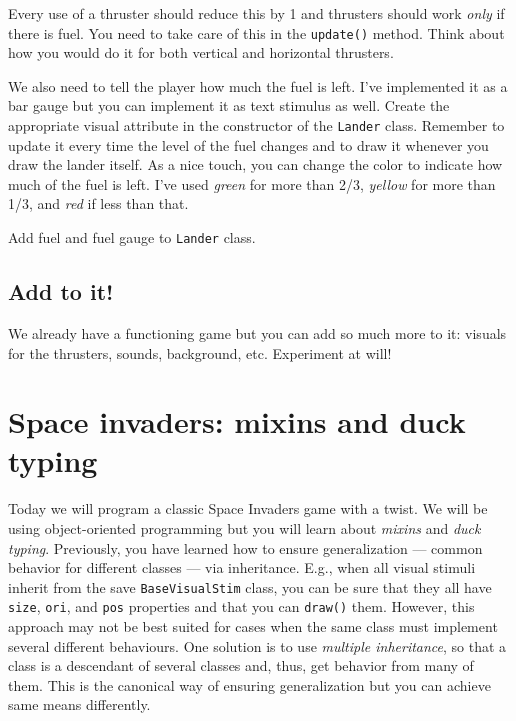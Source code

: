 \documentclass[
]{book}
\begin{document}
Every use of a thruster should reduce this by 1 and thrusters should work \emph{only} if there is fuel. You need to take care of this in the \texttt{update()} method. Think about how you would do it for both vertical and horizontal thrusters.

We also need to tell the player how much the fuel is left. I've implemented it as a bar gauge but you can implement it as text stimulus as well. Create the appropriate visual attribute in the constructor of the \texttt{Lander} class. Remember to update it every time the level of the fuel changes and to draw it whenever you draw the lander itself. As a nice touch, you can change the color to indicate how much of the fuel is left. I've used \emph{green} for more than 2/3, \emph{yellow} for more than 1/3, and \emph{red} if less than that.

Add fuel and fuel gauge to \texttt{Lander} class.

\hypertarget{add-to-it}{%
\section{Add to it!}\label{add-to-it}}

We already have a functioning game but you can add so much more to it: visuals for the thrusters, sounds, background, etc. Experiment at will!

\hypertarget{space-invaders}{%
\chapter{Space invaders: mixins and duck typing}\label{space-invaders}}

Today we will program a classic Space Invaders game with a twist. We will be using object-oriented programming but you will learn about \emph{mixins} and \emph{duck typing}. Previously, you have learned how to ensure generalization --- common behavior for different classes --- via inheritance. E.g., when all visual stimuli inherit from the save \texttt{BaseVisualStim} class, you can be sure that they all have \texttt{size}, \texttt{ori}, and \texttt{pos} properties and that you can \texttt{draw()} them. However, this approach may not be best suited for cases when the same class must implement several different behaviours. One solution is to use \emph{multiple inheritance}, so that a class is a descendant of several classes and, thus, get behavior from many of them. This is the canonical way of ensuring generalization but you can achieve same means differently.
\end{document}

